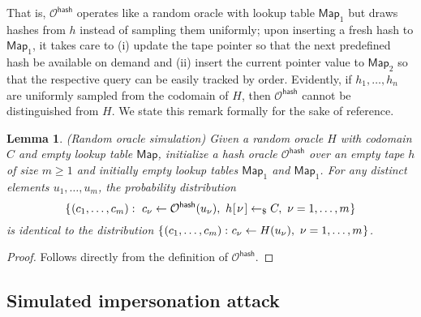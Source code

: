 \documentclass[10pt, psamsfonts, reqno]{amsart}
\newtheorem{lem}[thm]{Lemma}
\theoremstyle{definition}
\theoremstyle{remark}
\numberwithin{equation}{section}
\begin{document}
\noindent
That is, $\mathcal{O}^{\mathsf{hash}}$
operates like a random oracle with lookup table $\mathsf{Map}_1$
but draws hashes
from $h$ instead of sampling them uniformly;
upon inserting a fresh hash to $\mathsf{Map}_1$,
it takes care to
(i) update the tape pointer so that
the next predefined hash be available on demand and
(ii) insert the current pointer value to $\mathsf{Map}_2$
so that the respective query can be easily tracked by order.
Evidently, if $h_1, \dots, h_n$
are uniformly sampled from the codomain of $H$,
then $\mathcal{O}^{\mathsf{hash}}$
cannot be distinguished from $H$.
We state this remark formally for the sake of reference.

\begin{lem}\label{lemma_random_oracle_simulation}
\textup{(\textit{Random oracle simulation})}
Given a random oracle $H$ with codomain $C$
and empty lookup table $\mathsf{Map}$,
initialize a hash oracle $\mathcal{O}^{\mathsf{hash}}$
over an empty tape $h$ of size $m \ge 1$
and initially empty lookup tables $\mathsf{Map}_1$ and $\mathsf{Map}_1$.
For any distinct elements $u_1, \dots, u_m$,
the probability distribution
\vspace{5pt}
\begin{equation*}
\vspace{5pt}
\{\hspace{0.5pt}(c_1, \dots, c_m):
\ c_\nu \leftarrow \mathcal{O}^{\mathsf{hash}}(u_\nu),
\ h\hspace{0.5pt}
	[
		\hspace{1pt}
		\nu
		\hspace{1pt}
	]
	\leftarrow_\$
	C,
\ \nu = 1, \dots, m\hspace{0.5pt}\}
\end{equation*}
is identical to the distribution
$
\{\hspace{0.5pt}(c_1, \dots, c_m):\hspace{0.50pt}
c_\nu \leftarrow H(u_\nu),
\ \nu = 1, \dots, m\hspace{0.5pt}\}
$.
\end{lem}

\begin{proof}
Follows directly from the definition of $\mathcal{O}^{\mathsf{hash}}$.
\end{proof}

\subsection{Simulated impersonation attack}\label{section_simulated_impersonation_attack}
\end{document}

